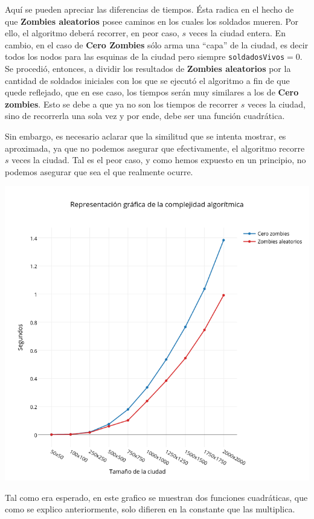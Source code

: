 Aquí se pueden apreciar las diferencias de tiempos. Ésta radica en el hecho de que \textbf{Zombies aleatorios} posee caminos en los cuales los soldados mueren. Por ello, el algoritmo deberá recorrer, en peor caso, $s$ veces la ciudad entera. En cambio, en el caso de \textbf{Cero Zombies} s\'olo arma una ``capa'' de la ciudad, es decir todos los nodos para las esquinas de la ciudad pero siempre \texttt{soldadosVivos}$=0$. \\

\newpage
Se procedió, entonces, a dividir los resultados de \textbf{Zombies aleatorios} por la cantidad de soldados iniciales con los que se ejecutó el algoritmo a fin de que quede reflejado, que en ese caso, los tiempos serán muy similares a los de \textbf{Cero zombies}. Esto se debe a que ya no son los tiempos de recorrer $s$ veces la ciudad, sino de recorrerla una sola vez y por ende, debe ser una función cuadrática.

Sin embargo, es necesario aclarar que la similitud que se intenta mostrar, es aproximada, ya que no podemos asegurar que efectivamente, el algoritmo recorre $s$ veces la ciudad. Tal es el peor caso, y como hemos expuesto en un principio, no podemos asegurar que sea el que realmente ocurre.

\includegraphics[width=15cm,keepaspectratio=yes]{imagenes/ej2/zaczados.png}

Tal como era esperado, en este grafico se muestran dos funciones cuadráticas, que como se explico anteriormente, solo difieren en la constante que las multiplica.

